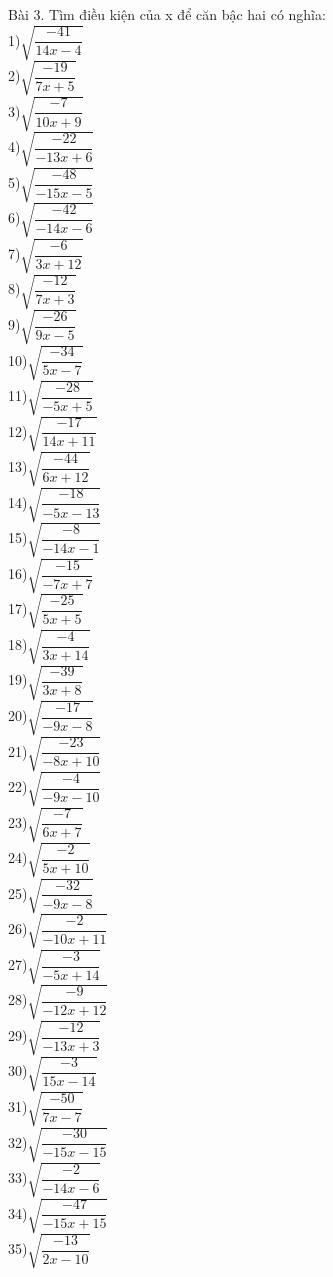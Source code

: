 \documentclass[12pt,a4paper]{article}
\begin{document}
Bài 3. Tìm điều kiện của x để căn bậc hai có nghĩa:\\
1)$\sqrt{\dfrac{-41}{14x-4}}$\\
2)$\sqrt{\dfrac{-19}{7x+5}}$\\
3)$\sqrt{\dfrac{-7}{10x+9}}$\\
4)$\sqrt{\dfrac{-22}{-13x+6}}$\\
5)$\sqrt{\dfrac{-48}{-15x-5}}$\\
6)$\sqrt{\dfrac{-42}{-14x-6}}$\\
7)$\sqrt{\dfrac{-6}{3x+12}}$\\
8)$\sqrt{\dfrac{-12}{7x+3}}$\\
9)$\sqrt{\dfrac{-26}{9x-5}}$\\
10)$\sqrt{\dfrac{-34}{5x-7}}$\\
11)$\sqrt{\dfrac{-28}{-5x+5}}$\\
12)$\sqrt{\dfrac{-17}{14x+11}}$\\
13)$\sqrt{\dfrac{-44}{6x+12}}$\\
14)$\sqrt{\dfrac{-18}{-5x-13}}$\\
15)$\sqrt{\dfrac{-8}{-14x-1}}$\\
16)$\sqrt{\dfrac{-15}{-7x+7}}$\\
17)$\sqrt{\dfrac{-25}{5x+5}}$\\
18)$\sqrt{\dfrac{-4}{3x+14}}$\\
19)$\sqrt{\dfrac{-39}{3x+8}}$\\
20)$\sqrt{\dfrac{-17}{-9x-8}}$\\
21)$\sqrt{\dfrac{-23}{-8x+10}}$\\
22)$\sqrt{\dfrac{-4}{-9x-10}}$\\
23)$\sqrt{\dfrac{-7}{6x+7}}$\\
24)$\sqrt{\dfrac{-2}{5x+10}}$\\
25)$\sqrt{\dfrac{-32}{-9x-8}}$\\
26)$\sqrt{\dfrac{-2}{-10x+11}}$\\
27)$\sqrt{\dfrac{-3}{-5x+14}}$\\
28)$\sqrt{\dfrac{-9}{-12x+12}}$\\
29)$\sqrt{\dfrac{-12}{-13x+3}}$\\
30)$\sqrt{\dfrac{-3}{15x-14}}$\\
31)$\sqrt{\dfrac{-50}{7x-7}}$\\
32)$\sqrt{\dfrac{-30}{-15x-15}}$\\
33)$\sqrt{\dfrac{-2}{-14x-6}}$\\
34)$\sqrt{\dfrac{-47}{-15x+15}}$\\
35)$\sqrt{\dfrac{-13}{2x-10}}$\\
\end{document}
